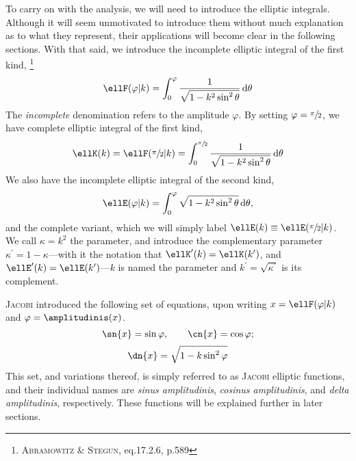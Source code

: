 To carry on with the analysis, we will need to introduce the elliptic integrals.
Although it will seem unmotivated to introduce them without much explanation as to what they represent, their applications will become clear in the following sections.
With that said, we introduce the incomplete elliptic integral of the first kind,%
\footnote{\cite{abramowitz1965handbook} \textsc{Abramowitz} \& \textsc{Stegun}, eq.17.2.6, p.589}
\begin{equation}\label{eq:incomplete_elliptic_integral_first}
  \ellF(\varphi \vert k) = \int_{0}^{\varphi} \frac{1}{\sqrt{1 - k^2 \sin^2{\theta}}}\,\dee\theta
\end{equation}
The \emph{incomplete} denomination refers to the amplitude $\varphi$.
By setting $\varphi = \sfrac{\pi}{2}$, we have complete elliptic integral of the first kind,
\begin{equation}\label{eq:complete_elliptic_integral_first}
  \ellK(k) = \ellF(\sfrac{\pi}{2} \vert k) = \int_{0}^{\sfrac{\pi}{2}} \frac{1}{\sqrt{1 - k^2 \sin^2{\theta}}} \,\dee\theta
\end{equation}
We also have the incomplete elliptic integral of the second kind,
\begin{equation}\label{eq:incomplete_elliptic_integral_second}
  \ellE(\varphi \vert k) = \int_{0}^{\varphi} \sqrt{1 - k^2 \sin^2{\theta}}\,\dee\theta,
\end{equation}
and the complete variant, which we will simply label $\ellE(k) \equiv \ellE(\sfrac{\pi}{2} \vert k)$.
We call $\kappa = k^2$ the parameter, and introduce the complementary parameter ${\kappa}^{\prime} = 1 - \kappa$---with it the notation that $\ellK^{\prime}(k) = \ellK(k^{\prime})$, and $\ellE^{\prime}(k) = \ellE(k^{\prime})$---$k$ is named the parameter and $k^{\prime} = \sqrt{\kappa^{\prime}}$ is its complement.

\textsc{Jacobi} introduced the following set of equations, upon writing $x = \ellF(\varphi \vert k)$ and $\varphi = \amplitudinis(x)$.
\begin{equation}\label{eq:jacobi_sn_cn}
  \sn{x} = \sin{\varphi}, \qquad \cn{x} = \cos{\varphi};
\end{equation}
\begin{equation}\label{eq:jacobi_dn}
  \dn{x} = \sqrt{1 - k\sin^2{\varphi}}
\end{equation}
This set, and variations thereof, is simply referred to as \textsc{Jacobi} elliptic functions, and their individual names are \emph{sinus amplitudinis}, \emph{cosinus amplitudinis}, and \emph{delta amplitudinis}, respectively.
These functions will be explained further in later sections.
